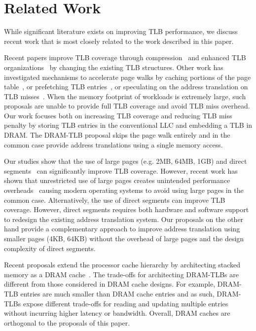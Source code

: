 \section{Related Work}

\noindent While significant literature exists on improving TLB
performance, we discuss recent work that is most closely related to
the work described in this paper.

 Recent papers improve TLB
coverage through compression~\cite{COLT, tlbreachclustering} and
enhanced TLB organizations~\cite{SharedLLT, simTLBperf} by changing
the existing TLB structures. Other work has investigated mechanisms to
accelerate page walks by caching portions of the page
table~\cite{SkipPT,MMUcaches}, or prefetching TLB
entries~\cite{prefTLBintercore, prefTLBgokul, prefTLBrecency,
power2014supporting}, or speculating on the address translation on TLB
misses~\cite{spectlb}. When the memory footprint of workloads is
extremely large, such proposals are unable to provide full TLB
coverage and avoid TLB miss overhead. Our work focuses both on
increasing TLB coverage and reducing TLB miss penalty by storing TLB
entries in the conventional LLC and embedding a TLB in DRAM. The
DRAM-TLB proposal skips the page walk entirely and in the common case
provide address translations using a single memory access.

 Our studies show
that the use of large pages (e.g. 2MB, 64MB, 1GB) and direct
segments~\cite{Basu2013} can significantly improve TLB coverage.
However, recent work has shown that unrestricted use of large pages
creates unintended performance
overheads~\cite{SuperPageProblem,TwoPageSize,numa-harmful,cameo,largepagevm}
causing modern operating systems to avoid using large pages in the
common case. Alternatively, the use of direct segments can improve TLB
coverage. However, direct segments requires both hardware and software
support to redesign the existing address translation system. Our
proposals on the other hand provide a complementary approach to
improve address translation using smaller pages (4KB, 64KB) without
the overhead of large pages and the design complexity of direct
segments. 

 Recent proposals extend
the processor cache hierarchy by architecting stacked memory as a DRAM
cache~\cite{BEAR, moin2012, unison, loh2011, jaewoong2012,
dramcache-resilient}. The trade-offs for architecting DRAM-TLBs are
different from those considered in DRAM cache designs. For example,
DRAM-TLB entries are much smaller than DRAM cache entries and as such,
DRAM-TLBs expose different trade-offs for reading and updating
multiple entries without incurring higher latency or bandwidth. 
Overall, DRAM caches are orthogonal to the proposals of
this paper.

